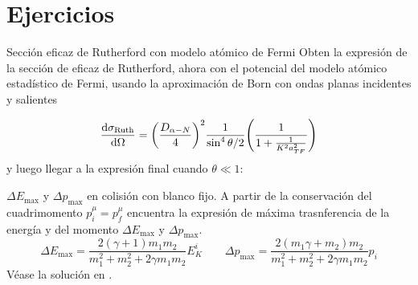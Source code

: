 \section*{Ejercicios}




\begin{Ejercicio}{Sección eficaz de Rutherford con modelo atómico de Fermi} \label{Ej:02.01}
    Obten la expresión de la sección de eficaz de Rutherford, ahora con el potencial del modelo atómico estadístico de Fermi, usando la aproximación de Born con ondas planas incidentes y salientes

    \begin{equation*}
        \dv{\sigma_{\Ruth}}{\Omega} =  \pqty{\frac{D_{\alpha-N}}{4}}^2 \frac{1}{\sin^4 \theta/2} \pqty{\frac{1}{1+\frac{1}{K^2 a_{TF}^2}}}
    \end{equation*}
    y luego llegar a la expresión final cuando $\theta\ll 1$: 
\end{Ejercicio}

\begin{Ejercicio}{$\Delta E_{\max}$ y $\Delta p_{\max}$ en colisión con blanco fijo.} \label{Ej:02.02}
    A partir de la conservación del cuadrimomento $p^{\mu}_i = p^{\mu}_f$ encuentra la expresión de máxima trasnferencia de la energía y del momento $\Delta E_{\max}$ y $\Delta p_{\max}$. 
    \begin{equation}
        \Delta E_{\max} = \frac{2(\gamma+1)m_1m_2}{m_1^2 + m_2^2 + 2 \gamma m_1 m_2} E_K^i \qquad 
        \Delta p_{\max} = \frac{2(m_1\gamma+m_2)m_2}{m_1^2 + m_2^2 + 2 \gamma m_1 m_2} p_i 
    \end{equation}
    Véase la solución en \cite{Montaruli201x_Exercise4}.
\end{Ejercicio}

